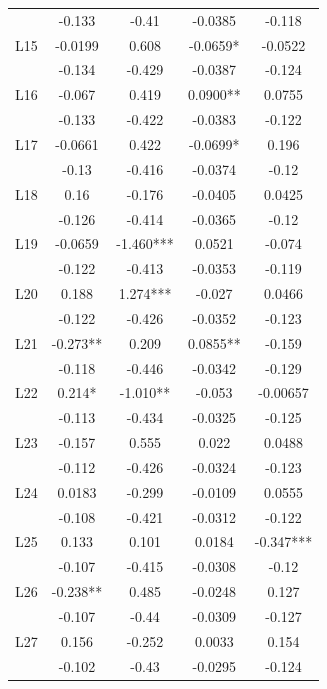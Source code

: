 \documentclass[]{ecca}
\begin{document}
\begin{center}
\begin{longtable}{ccccc}
		& -0.133    & -0.41     & -0.0385  & -0.118    \\
		L15          & -0.0199   & 0.608     & -0.0659* & -0.0522   \\
		& -0.134    & -0.429    & -0.0387  & -0.124    \\
		L16          & -0.067    & 0.419     & 0.0900** & 0.0755    \\
		& -0.133    & -0.422    & -0.0383  & -0.122    \\
		L17          & -0.0661   & 0.422     & -0.0699* & 0.196     \\
		& -0.13     & -0.416    & -0.0374  & -0.12     \\
		L18          & 0.16      & -0.176    & -0.0405  & 0.0425    \\
		& -0.126    & -0.414    & -0.0365  & -0.12     \\
		L19          & -0.0659   & -1.460*** & 0.0521   & -0.074    \\
		& -0.122    & -0.413    & -0.0353  & -0.119    \\
		L20          & 0.188     & 1.274***  & -0.027   & 0.0466    \\
		& -0.122    & -0.426    & -0.0352  & -0.123    \\
		L21          & -0.273**  & 0.209     & 0.0855** & -0.159    \\
		& -0.118    & -0.446    & -0.0342  & -0.129    \\
		L22          & 0.214*    & -1.010**  & -0.053   & -0.00657  \\
		& -0.113    & -0.434    & -0.0325  & -0.125    \\
		L23          & -0.157    & 0.555     & 0.022    & 0.0488    \\
		& -0.112    & -0.426    & -0.0324  & -0.123    \\
		L24          & 0.0183    & -0.299    & -0.0109  & 0.0555    \\
		& -0.108    & -0.421    & -0.0312  & -0.122    \\
		L25          & 0.133     & 0.101     & 0.0184   & -0.347*** \\
		& -0.107    & -0.415    & -0.0308  & -0.12     \\
		L26          & -0.238**  & 0.485     & -0.0248  & 0.127     \\
		& -0.107    & -0.44     & -0.0309  & -0.127    \\
		L27          & 0.156     & -0.252    & 0.0033   & 0.154     \\
		& -0.102    & -0.43     & -0.0295  & -0.124    \\

\end{longtable}
\end{center}
\end{document}
